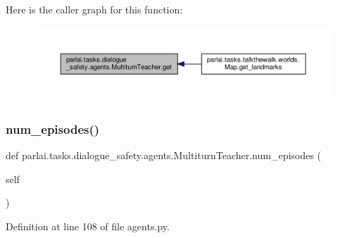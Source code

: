 Here is the caller graph for this function\+:
\nopagebreak
\begin{figure}[H]
\begin{center}
\leavevmode
\includegraphics[width=350pt]{classparlai_1_1tasks_1_1dialogue__safety_1_1agents_1_1MultiturnTeacher_a75d52a7b90a5566b10803ad5d1c8acf0_icgraph}
\end{center}
\end{figure}
\mbox{\label{classparlai_1_1tasks_1_1dialogue__safety_1_1agents_1_1MultiturnTeacher_a575c593a682c770a7c13f98fc7a3ce79}} 
\subsubsection{\texorpdfstring{num\+\_\+episodes()}{num\_episodes()}}
{\footnotesize\ttfamily def parlai.\+tasks.\+dialogue\+\_\+safety.\+agents.\+Multiturn\+Teacher.\+num\+\_\+episodes (\begin{DoxyParamCaption}\item[{}]{self }\end{DoxyParamCaption})}



Definition at line 108 of file agents.\+py.



